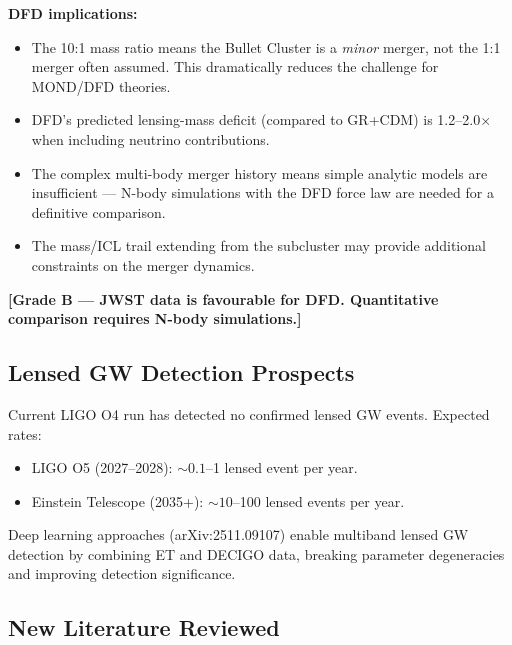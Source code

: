 \documentclass[11pt]{article}
\begin{document}
\textbf{DFD implications:}
\begin{itemize}
  \item The 10:1 mass ratio means the Bullet Cluster is a \emph{minor}
    merger, not the 1:1 merger often assumed. This dramatically reduces
    the challenge for MOND/DFD theories.
  \item DFD's predicted lensing-mass deficit (compared to GR+CDM) is
    1.2--2.0$\times$ when including neutrino contributions.
  \item The complex multi-body merger history means simple analytic
    models are insufficient --- N-body simulations with the DFD force
    law are needed for a definitive comparison.
  \item The mass/ICL trail extending from the subcluster may provide
    additional constraints on the merger dynamics.
\end{itemize}

\textbf{[Grade B --- JWST data is favourable for DFD. Quantitative
comparison requires N-body simulations.]}

\subsection{Lensed GW Detection Prospects}

Current LIGO O4 run has detected no confirmed lensed GW events.
Expected rates:
\begin{itemize}
  \item LIGO O5 (2027--2028): $\sim 0.1$--1 lensed event per year.
  \item Einstein Telescope (2035+): $\sim 10$--100 lensed events per year.
\end{itemize}

Deep learning approaches (arXiv:2511.09107) enable multiband lensed GW
detection by combining ET and DECIGO data, breaking parameter degeneracies
and improving detection significance.

\subsection{New Literature Reviewed}
\end{document}
